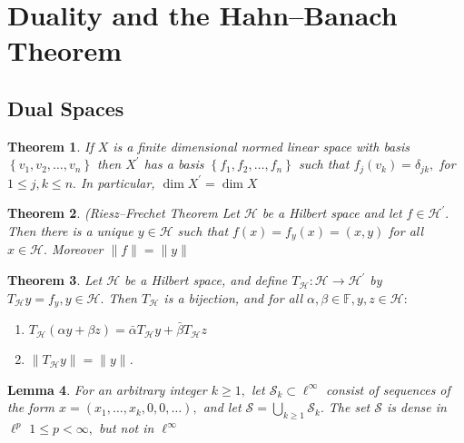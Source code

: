 \documentclass[10pt]{paper}
\newtheorem{theorem}{Theorem}[section]
\newtheorem{lemma}[theorem]{Lemma}
\begin{document}
\section{Duality and the Hahn–Banach Theorem}

\subsection{Dual Spaces}

\begin{theorem}
    If $X$ is a finite dimensional normed linear space with basis $\left\{v_{1}, v_{2}, \ldots, v_{n}\right\}$ then $X^{\prime}$ has a basis $\left\{f_{1}, f_{2}, \ldots, f_{n}\right\}$ such that $f_{j}\left(v_{k}\right)=\delta_{j k},$ for $1 \leq j, k \leq n .$ In particular, $\operatorname{dim} X^{\prime}=\operatorname{dim} X$
\end{theorem}

\begin{theorem}{(Riesz–Frechet Theorem}
    Let $\mathcal{H}$ be a Hilbert space and let $f \in \mathcal{H}^{\prime} .$ Then there is a unique $y \in \mathcal{H}$ such that $f(x)=f_{y}(x)=(x, y)$ for all $x \in \mathcal{H} .$ Moreover $\|f\|=\|y\|$
\end{theorem}

\begin{theorem}
    Let $\mathcal{H}$ be a Hilbert space, and define $T_{\mathcal{H}}: \mathcal{H} \rightarrow \mathcal{H}^{\prime}$ by $T_{\mathcal{H}} y=f_{y}, y \in \mathcal{H} .$ Then
    $T_{\mathcal{H}}$ is a bijection, and for all $\alpha, \beta \in \mathbb{F}, y, z \in \mathcal{H}:$
    \begin{enumerate}
        \item $T_{\mathcal{H}}(\alpha y+\beta z)=\bar{\alpha} T_{\mathcal{H}} y+\bar{\beta} T_{\mathcal{H}} z$
        \item $\left\|T_{\mathcal{H}} y\right\|=\|y\|$.
    \end{enumerate}
\end{theorem}

\begin{lemma}
    For an arbitrary integer $k \geq 1,$ let $\mathcal{S}_{k} \subset \ell^{\infty}$ consist of sequences of the form $x=\left(x_{1}, \ldots, x_{k}, 0,0, \ldots\right),$ and let $\mathcal{S}=\bigcup_{k \geq 1} \mathcal{S}_{k} .$ The set $\mathcal{S}$ is dense in $\ell^{p}$ $1 \leq p<\infty,$ but not in $\ell^{\infty}$
\end{lemma}
\end{document}
